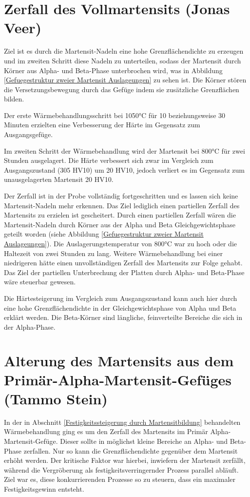 \documentclass[a4paper, 11pt]{tubsreprt}
\begin{document}
\newpage
\section{Zerfall des Vollmartensits (Jonas Veer)}\label{Kapitel Zerfall des Vollmartensits}

Ziel ist es durch die Martensit-Nadeln eine hohe Grenzflächendichte zu erzeugen und im zweiten Schritt diese Nadeln zu unterteilen, sodass der Martensit durch Körner aus Alpha- und Beta-Phase unterbrochen wird, was in Abbildung \ref{Gefuegestruktur zweier Martensit Auslageungen} zu sehen ist. Die Körner stören die Versetzungsbewegung durch das Gefüge indem sie zusätzliche Grenzflächen bilden.

Der erste Wärmebehandlungsschritt bei 1050°C für 10 beziehungsweise 30 Minuten erzielten eine Verbesserung der Härte im Gegensatz zum Ausgangsgefüge.

Im zweiten Schritt der Wärmebehandlung wird der Martensit bei 800°C für zwei Stunden ausgelagert. Die Härte verbessert sich zwar im Vergleich zum Ausgangszustand (305 HV10) um 20 HV10, jedoch verliert es im Gegensatz zum unausgelagerten Martensit 20 HV10.

Der Zerfall ist in der Probe vollständig fortgeschritten und es lassen sich keine Martensit-Nadeln mehr erkennen. Das Ziel lediglich einen partiellen Zerfall des Martensits zu erzielen ist gescheitert. Durch einen partiellen Zerfall wären die Martensit-Nadeln durch Körner aus der Alpha und Beta Gleichgewichtsphase geteilt worden (siehe Abbildung \ref{Gefuegestruktur zweier Martensit Auslageungen}). Die Auslagerungstemperatur von 800°C war zu hoch oder die Haltezeit von zwei Stunden zu lang. 
Weitere Wärmebehandlung bei einer niedrigeren hätte einen unvollständigen Zerfall des Martensits zur Folge gehabt. Das Ziel der partiellen Unterbrechung der Platten durch Alpha- und Beta-Phase wäre steuerbar gewesen. 

Die Härtesteigerung im Vergleich zum Ausgangszustand kann auch hier durch eine hohe Grenzflächendichte in der Gleichgewichtsphase von Alpha und Beta erklärt werden. Die Beta-Körner sind längliche, feinverteilte Bereiche die sich in der Alpha-Phase.  
\newpage
\section{Alterung des Martensits aus dem Primär-Alpha-Martensit-Gefüges (Tammo Stein)}
In der in Abschnitt \ref{Festigkeitssteigerung durch Martensitbildung} behandelten Wärmebehandlung ging es um den Zerfall des Martensits im Primär Alpha-Martensit-Gefüge. Dieser sollte in möglichst kleine Bereiche an Alpha- und Beta-Phase zerfallen. Nur so kann die Grenzflächendichte gegenüber dem Martensit erhöht werden. Der kritische Faktor war hierbei, inwiefern der Martensit zerfällt, während die Vergröberung als festigkeitsverringernder Prozess parallel abläuft. Ziel war es, diese konkurrierenden Prozesse so zu steuern, dass ein maximaler Festigkeitsgewinn entsteht. 
\end{document}

